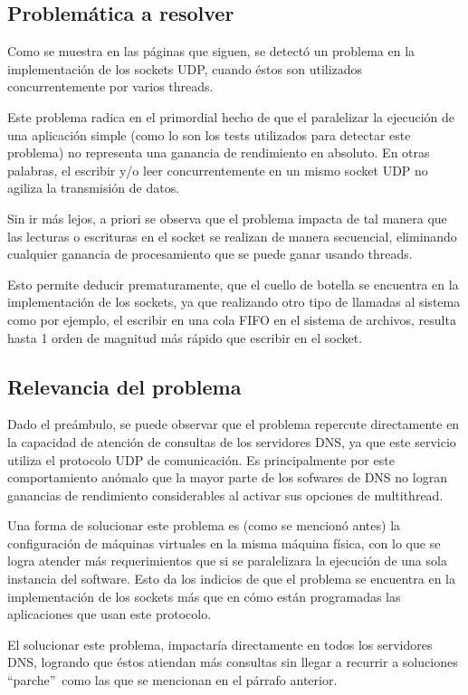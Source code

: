 \documentclass[12pt,spanish,letterpaper]{article}
\begin{document}
\subsection{Problemática a resolver}
\par Como se muestra en las páginas que siguen, se detectó un problema en la implementación de los sockets UDP, cuando éstos son utilizados concurrentemente por varios threads.
\par Este problema radica en el primordial hecho de que el paralelizar la ejecución de una aplicación simple (como lo son los tests utilizados para detectar este problema) no representa una ganancia de rendimiento en absoluto. En otras palabras, el escribir y/o leer concurrentemente en un mismo socket UDP no agiliza la transmisión de datos.
\par Sin ir más lejos, a priori se observa que el problema impacta de tal manera que las lecturas o escrituras en el socket se realizan de manera secuencial, eliminando cualquier ganancia de procesamiento que se puede ganar usando threads.
\par Esto permite deducir prematuramente, que el cuello de botella se encuentra en la implementación de los sockets, ya que realizando otro tipo de llamadas al sistema como por ejemplo, el escribir en una cola FIFO en el sistema de archivos, resulta hasta 1 orden de magnitud más rápido que escribir en el socket.
\subsection{Relevancia del problema}
\par Dado el preámbulo, se puede observar que el problema repercute directamente en la capacidad de atención de consultas de los servidores DNS, ya que este servicio utiliza el protocolo UDP de comunicación. Es principalmente por este comportamiento anómalo que la mayor parte de los sofwares de DNS no logran ganancias de rendimiento considerables al activar sus opciones de multithread.
\par Una forma de solucionar este problema es (como se mencionó antes) la configuración de máquinas virtuales en la misma máquina física, con lo que se logra atender más requerimientos que si se paralelizara la ejecución de una sola instancia del software. Esto da los indicios de que el problema se encuentra en la implementación de los sockets más que en cómo están programadas las aplicaciones que usan este protocolo.
\par El solucionar este problema, impactaría directamente en todos los servidores DNS, logrando que éstos atiendan más consultas sin llegar a recurrir a soluciones \textquotedblleft parche\textquotedblright\ como las que se mencionan en el párrafo anterior.
\end{document}
